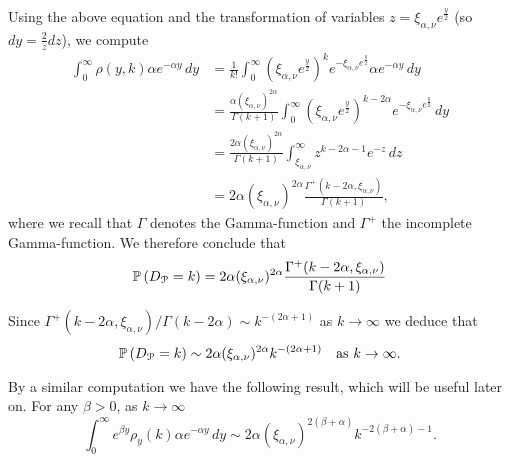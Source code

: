 Using the above equation and the transformation of variables $z = \xi_{\alpha,\nu}e^{\frac{y}{2}}$ (so $dy = \frac{2}{z}dz$), we compute
\begin{align*}
	\int_0^\infty \rho(y,k) \alpha e^{-\alpha y} \, dy 
    &= \frac{1}{k!} \int_0^\infty \left(\xi_{\alpha,\nu} e^{\frac{y}{2}}\right)^k 
    	e^{-\xi_{\alpha,\nu} e^{\frac{y}{2}}} \alpha e^{-\alpha y} \, dy\\
    &= \frac{\alpha (\xi_{\alpha,\nu})^{2\alpha}}{\Gamma(k+1)} \int_0^\infty 
    	\left(\xi_{\alpha,\nu} e^{\frac{y}{2}}\right)^{k - 2\alpha} e^{-\xi_{\alpha,\nu} e^{\frac{y}{2}}}
        \, dy\\
    &= \frac{2\alpha (\xi_{\alpha,\nu})^{2\alpha}}{\Gamma(k+1)} \int_{\xi_{\alpha,\nu}}^{\infty} 
    	z^{k -2\alpha-1} e^{-z} \, dz\\
    &=2\alpha (\xi_{\alpha,\nu})^{2\alpha} \frac{\Gamma^+(k - 2\alpha, \xi_{\alpha,\nu})}{\Gamma(k+1)},
\end{align*}
where we recall that $\Gamma$ denotes the Gamma-function and $\Gamma^{+}$ the incomplete Gamma-function.
We therefore conclude that
\begin{equation}\label{eq:degree_distribution_P}
	\mathbb{P}\left(D_{{\mathcal P}} = k\right) = 2\alpha (\xi_{\alpha,\nu})^{2\alpha} \frac{\Gamma^+(k - 2\alpha, \xi_{\alpha,\nu})}{\Gamma(k+1)}
\end{equation}

Since $\Gamma^{+}(k-2\alpha, \xi_{\alpha,\nu})/\Gamma(k - 2\alpha) \sim k^{-(2\alpha+1)}$ as $k \to \infty$
  
 we deduce that
\begin{equation}\label{eq:degree_distribution_P_asymptotics}
	\mathbb{P}\left(D_{{\mathcal P}} = k\right) \sim 2\alpha (\xi_{\alpha,\nu})^{2\alpha} k^{-(2\alpha + 1)}
	\quad \text{as } k \to \infty.
\end{equation}

By a similar computation we have the following result, which will be useful later on. For any $\beta > 0$, as $k \to \infty$
\begin{equation}\label{eq:general_integral_rho_y_k}
	\int_0^\infty e^{\beta y} \rho_y(k) \alpha e^{-\alpha y} \, dy
    \sim 2\alpha \left(\xi_{\alpha,\nu}\right)^{2(\beta + \alpha)} k^{-2(\beta + \alpha)-1}.
\end{equation}

